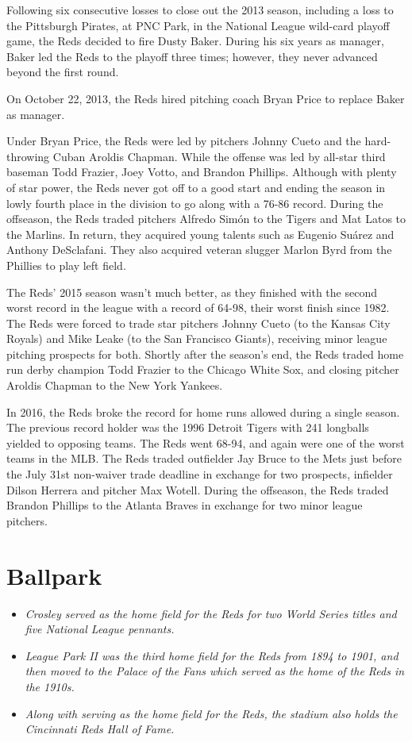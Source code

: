 Following six consecutive losses to close out the 2013 season, including
a loss to the Pittsburgh Pirates, at PNC Park, in the National League
wild-card playoff game, the Reds decided to fire Dusty Baker. During his
six years as manager, Baker led the Reds to the playoff three times;
however, they never advanced beyond the first round.

On October 22, 2013, the Reds hired pitching coach Bryan Price to
replace Baker as manager.

Under Bryan Price, the Reds were led by pitchers Johnny Cueto and the
hard-throwing Cuban Aroldis Chapman. While the offense was led by
all-star third baseman Todd Frazier, Joey Votto, and Brandon Phillips.
Although with plenty of star power, the Reds never got off to a good
start and ending the season in lowly fourth place in the division to go
along with a 76-86 record. During the offseason, the Reds traded
pitchers Alfredo Simón to the Tigers and Mat Latos to the Marlins. In
return, they acquired young talents such as Eugenio Suárez and Anthony
DeSclafani. They also acquired veteran slugger Marlon Byrd from the
Phillies to play left field.

The Reds' 2015 season wasn't much better, as they finished with the
second worst record in the league with a record of 64-98, their worst
finish since 1982. The Reds were forced to trade star pitchers Johnny
Cueto (to the Kansas City Royals) and Mike Leake (to the San Francisco
Giants), receiving minor league pitching prospects for both. Shortly
after the season's end, the Reds traded home run derby champion Todd
Frazier to the Chicago White Sox, and closing pitcher Aroldis Chapman to
the New York Yankees.

In 2016, the Reds broke the record for home runs allowed during a single
season. The previous record holder was the 1996 Detroit Tigers with 241
longballs yielded to opposing teams. The Reds went 68-94, and again were
one of the worst teams in the MLB. The Reds traded outfielder Jay Bruce
to the Mets just before the July 31st non-waiver trade deadline in
exchange for two prospects, infielder Dilson Herrera and pitcher Max
Wotell. During the offseason, the Reds traded Brandon Phillips to the
Atlanta Braves in exchange for two minor league pitchers.

\section{Ballpark}\label{ballpark}

\begin{itemize}
\item
  \emph{Crosley served as the home field for the Reds for two World
  Series titles and five National League pennants.}
\item
  \emph{League Park II was the third home field for the Reds from 1894
  to 1901, and then moved to the Palace of the Fans which served as the
  home of the Reds in the 1910s.}
\item
  \emph{Along with serving as the home field for the Reds, the stadium
  also holds the Cincinnati Reds Hall of Fame.}
\end{itemize}

